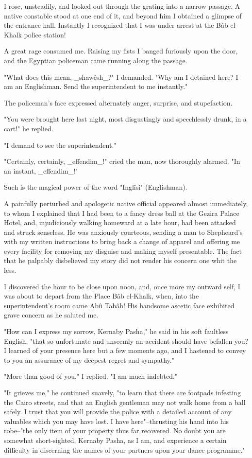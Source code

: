 I rose, unsteadily, and looked out through the grating into a narrow
passage. A native constable stood at one end of it, and beyond him I
obtained a glimpse of the entrance hall. Instantly I recognized that
I was under arrest at the Bâb el-Khalk police station!

A great rage consumed me. Raising my fists I banged furiously upon
the door, and the Egyptian policeman came running along the passage.

"What does this mean, _shawêsh_?" I demanded. "Why am I detained here?
I am an Englishman. Send the superintendent to me instantly."

The policeman's face expressed alternately anger, surprise, and
stupefaction.

"You were brought here last night, most disgustingly and speechlessly
drunk, in a cart!" he replied.

"I demand to see the superintendent."

"Certainly, certainly, _effendim_!" cried the man, now thoroughly
alarmed. "In an instant, _effendim_!"

Such is the magical power of the word "Inglîsi" (Englishman).

A painfully perturbed and apologetic native official appeared almost
immediately, to whom I explained that I had been to a fancy dress ball
at the Gezira Palace Hotel, and, injudiciously walking homeward at a
late hour, had been attacked and struck senseless. He was anxiously
courteous, sending a man to Shepheard's with my written instructions
to bring back a change of apparel and offering me every facility for
removing my disguise and making myself presentable. The fact that he
palpably disbelieved my story did not render his concern one whit the
less.

I discovered the hour to be close upon noon, and, once more my outward
self, I was about to depart from the Place Bâb el-Khalk, when, into
the superintendent's room came Abû Tabâh! His handsome ascetic face
exhibited grave concern as he saluted me.

"How can I express my sorrow, Kernaby Pasha," he said in his soft
faultless English, "that so unfortunate and unseemly an accident
should have befallen you? I learned of your presence here but a few
moments ago, and I hastened to convey to you an assurance of my
deepest regret and sympathy."

"More than good of you," I replied. "I am much indebted."

"It grieves me," he continued suavely, "to learn that there are
footpads infesting the Cairo streets, and that an English gentleman
may not walk home from a ball safely. I trust that you will provide
the police with a detailed account of any valuables which you may have
lost. I have here"--thrusting his hand into his robe--"the only item
of your property thus far recovered. No doubt you are somewhat
short-sighted, Kernaby Pasha, as I am, and experience a certain
difficulty in discerning the names of your partners upon your dance
programme."

